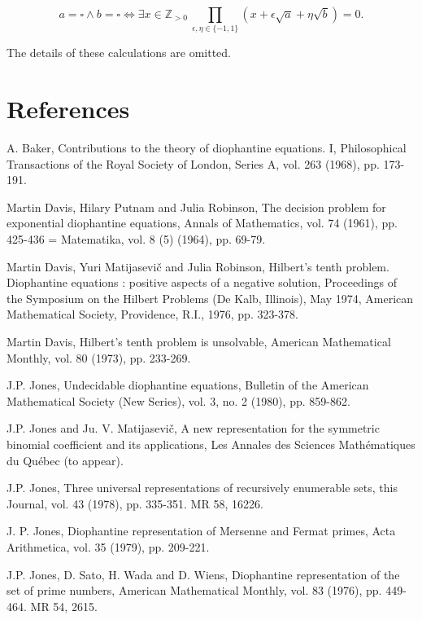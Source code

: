 \documentclass[11pt,a4paper]{article}
\newcommand{\origpage}[1]{\marginnote{\footnotesize\textbf{[#1]}}}
\begin{document}
\[
a=\square \wedge b=\square \Leftrightarrow \exists x\in\mathbb Z_{>0}\ \prod_{\epsilon,\eta\in\{-1,1\}}(x+\epsilon\sqrt a+\eta\sqrt b)=0 .
\]

The details of these calculations are omitted.

\section*{References}\small\begin{list}{}{\setlength{\leftmargin}{2.4em}\setlength{\labelwidth}{2em}\setlength{\labelsep}{.4em}\setlength{\itemsep}{.5em}}
\item[\textup{[1]}] A. Baker, Contributions to the theory of diophantine equations. I, Philosophical Transactions of the Royal Society of London, Series A, vol. 263 (1968), pp. 173-191.
\item[\textup{[2]}] Martin Davis, Hilary Putnam and Julia Robinson, The decision problem for exponential diophantine equations, Annals of Mathematics, vol. 74 (1961), pp. 425-436 = Matematika, vol. 8 (5) (1964), pp. 69-79.
\item[\textup{[3]}] Martin Davis, Yuri Matijasevič and Julia Robinson, Hilbert's tenth problem. Diophantine equations : positive aspects of a negative solution, Proceedings of the Symposium on the Hilbert Problems (De Kalb, Illinois), May 1974, American Mathematical Society, Providence, R.I., 1976, pp. 323-378.
\item[\textup{[4]}] Martin Davis, Hilbert's tenth problem is unsolvable, American Mathematical Monthly, vol. 80 (1973), pp. 233-269.
\item[\textup{[5]}] J.P. Jones, Undecidable diophantine equations, Bulletin of the American Mathematical Society (New Series), vol. 3, no. 2 (1980), pp. 859-862.
\item[\textup{[6]}] J.P. Jones and Ju. V. Matijasevič, A new representation for the symmetric binomial coefficient and its applications, Les Annales des Sciences Mathématiques du Québec (to appear).
\item[\textup{[7]}] J.P. Jones, Three universal representations of recursively enumerable sets, this Journal, vol. 43 (1978), pp. 335-351. MR 58, 16226.
\item[\textup{[8]}] J. P. Jones, Diophantine representation of Mersenne and Fermat primes, Acta Arithmetica, vol. 35 (1979), pp. 209-221.
\item[\textup{[9]}]\origpage{571} J.P. Jones, D. Sato, H. Wada and D. Wiens, Diophantine representation of the set of prime numbers, American Mathematical Monthly, vol. 83 (1976), pp. 449-464. MR 54, 2615.

\end{list}
\end{document}
